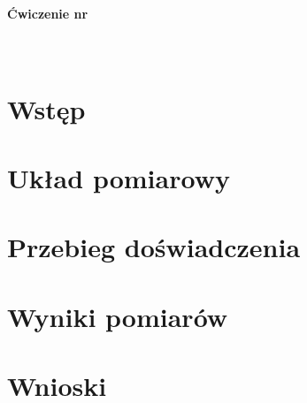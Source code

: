 \documentclass[a4paper,11pt]{article}
\begin{document}


\vspace{1cm}
\begin{center}
	\Huge{\textbf{\Temat}} \\
	\vspace{0.5cm}
	\Large{\textbf{Ćwiczenie nr \NrCwiczenia}} \\
	\vspace{0.5cm}
	\large{\PierwszyAutor} \\
	\large{\DrugiAutor} \\
	\vspace{1cm}
\end{center}

\tableofcontents

\newpage 
\section{Wstęp}



\section{Układ pomiarowy}



\section{Przebieg doświadczenia}



\section{Wyniki pomiarów}





\section{Wnioski}


\end{document}

